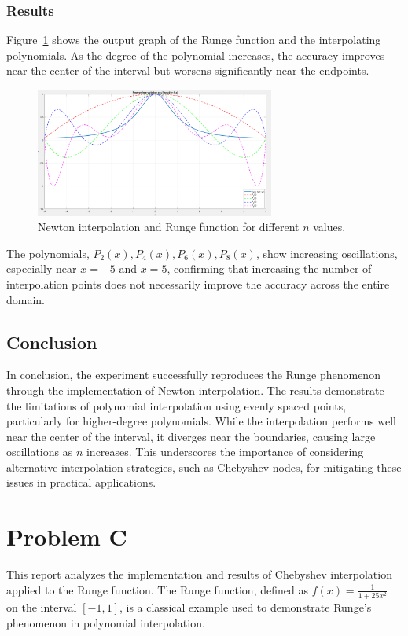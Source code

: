\documentclass{article}
\begin{document}
\subsubsection{Results}

Figure~\ref{fig:runge_plot} shows the output graph of the Runge function and the interpolating polynomials. As the degree of the polynomial increases, the accuracy improves near the center of the interval but worsens significantly near the endpoints.

\begin{figure}[H]
    \centering
    \includegraphics[width=0.7\textwidth]{runge1.png}
    \caption{Newton interpolation and Runge function for different $n$ values.}
    \label{fig:runge_plot}
\end{figure}

The polynomials, $P_2(x), P_4(x), P_6(x), P_8(x)$, show increasing oscillations, especially near $x = -5$ and $x = 5$, confirming that increasing the number of interpolation points does not necessarily improve the accuracy across the entire domain.

\subsection{Conclusion}

In conclusion, the experiment successfully reproduces the Runge phenomenon through the implementation of Newton interpolation. The results demonstrate the limitations of polynomial interpolation using evenly spaced points, particularly for higher-degree polynomials. While the interpolation performs well near the center of the interval, it diverges near the boundaries, causing large oscillations as $n$ increases. This underscores the importance of considering alternative interpolation strategies, such as Chebyshev nodes, for mitigating these issues in practical applications.





\section{Problem C}
This report analyzes the implementation and results of Chebyshev interpolation applied to the Runge function. The Runge function, defined as $f(x) = \frac{1}{1 + 25x^2}$ on the interval $[-1,1]$, is a classical example used to demonstrate Runge's phenomenon in polynomial interpolation.
\end{document}
